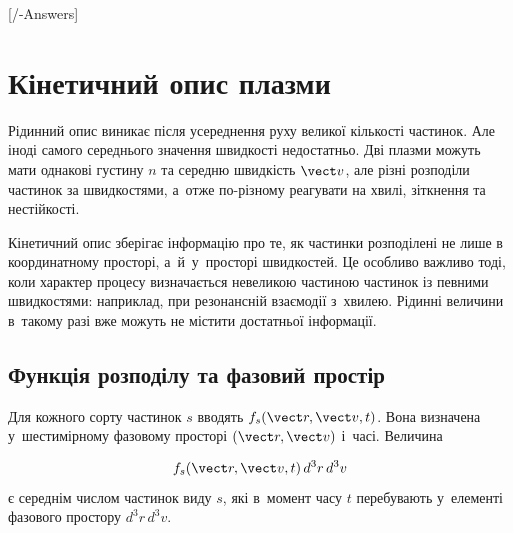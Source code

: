 

\graphicspath{{\currfilebase/Pictures}}

[\currfilebase/\currfilebase-Answers]
\chapter{Кінетичний опис плазми}\label{sec:plasma-kinetic}\hypertarget{plasma-kinetic}{}

Рідинний опис виникає після усереднення руху великої кількості частинок. Але іноді самого
середнього значення швидкості недостатньо. Дві плазми можуть мати однакові густину $n$ та
середню швидкість $\vect v$, але різні розподіли частинок за швидкостями, а~отже
по-різному реагувати на хвилі, зіткнення та нестійкості.

Кінетичний опис зберігає інформацію про те, як частинки розподілені не лише в
координатному просторі, а~й~у~просторі швидкостей. Це особливо важливо тоді, коли характер
процесу визначається невеликою частиною частинок із певними швидкостями: наприклад, при
резонансній взаємодії з~хвилею. Рідинні величини в~такому разі вже можуть не містити
достатньої інформації.

\section{Функція розподілу та фазовий простір}

Для кожного сорту частинок $s$ вводять  $f_s(\vect r,\vect v,t)$.
Вона визначена у~шестимірному фазовому просторі $(\vect r,\vect v)$ і~часі. Величина

\begin{equation*}
f_s(\vect r,\vect v,t)\,d^3r\,d^3v
\end{equation*}
%
є середнім числом частинок виду $s$, які в~момент часу $t$ перебувають у~елементі фазового
простору $d^3r\,d^3v$.

